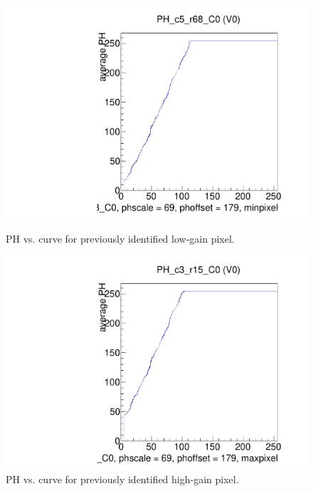 \begin{figure}[!htp]
\centering
\begin{minipage}{0.45\textwidth}
  \includegraphics[width=1.0\textwidth]{figures/phopt_PH_c5_r68.pdf}
  \caption{PH vs. \vcal curve for previously identified low-gain pixel.}
  \label{fig:phopt_PH_c5_r68}
\end{minipage}
\hspace{0.3cm}
\begin{minipage}{0.45\textwidth}
  \includegraphics[width=1.0\textwidth]{figures/phopt_PH_c3_r15.pdf}
  \caption{PH vs. \vcal curve for previously identified high-gain pixel.}
  \label{fig:phopt_PH_c3_r15}
\end{minipage}
\end{figure}



